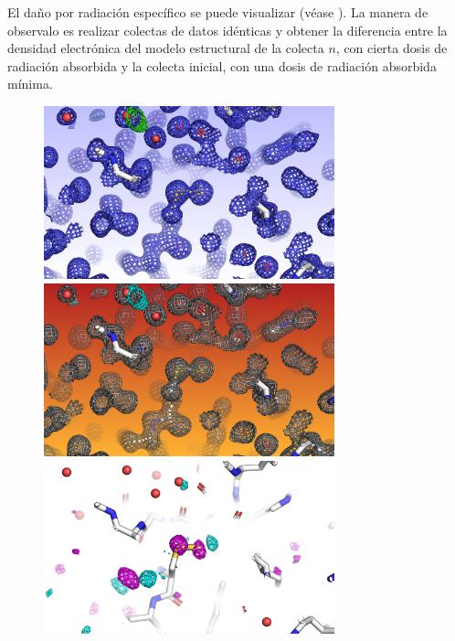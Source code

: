 El daño por radiación específico se puede visualizar (véase ). La manera de observalo es realizar colectas de datos idénticas y obtener la diferencia entre la densidad electrónica del modelo estructural de la colecta $n$, con cierta dosis de radiación absorbida y la colecta inicial, con una dosis de radiación absorbida mínima.

\begin{figure}[hb]
	\includegraphics[width=0.75\textwidth]{imgs/before}
	\includegraphics[width=0.75\textwidth]{imgs/after}
	\includegraphics[width=0.75\textwidth]{imgs/diff}

\end{figure}

